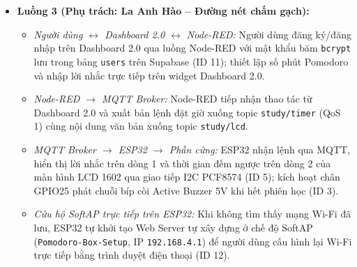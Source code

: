 \begin{itemize}[leftmargin=0.8cm, noitemsep, topsep=2pt]
    \item \textbf{Luồng 3 (Phụ trách: La Anh Hào -- Đường nét chấm gạch):}
    \begin{itemize}[leftmargin=0.5cm, noitemsep]
        \item \textit{Người dùng $\leftrightarrow$ Dashboard 2.0 $\leftrightarrow$ Node-RED:} Người dùng đăng ký/đăng nhập trên Dashboard 2.0 qua luồng Node-RED với mật khẩu băm \texttt{bcrypt} lưu trong bảng \texttt{users} trên Supabase (ID 11); thiết lập số phút Pomodoro và nhập lời nhắc trực tiếp trên widget Dashboard 2.0.
        \item \textit{Node-RED $\rightarrow$ MQTT Broker:} Node-RED tiếp nhận thao tác từ Dashboard 2.0 và xuất bản lệnh đặt giờ xuống topic \texttt{study/timer} (QoS 1) cùng nội dung văn bản xuống topic \texttt{study/lcd}.
        \item \textit{MQTT Broker $\rightarrow$ ESP32 $\rightarrow$ Phần cứng:} ESP32 nhận lệnh qua MQTT, hiển thị lời nhắc trên dòng 1 và thời gian đếm ngược trên dòng 2 của màn hình LCD 1602 qua giao tiếp I2C PCF8574 (ID 5); kích hoạt chân GPIO25 phát chuỗi bíp còi Active Buzzer 5V khi hết phiên học (ID 3).
        \item \textit{Cứu hộ SoftAP trực tiếp trên ESP32:} Khi không tìm thấy mạng Wi-Fi đã lưu, ESP32 tự khởi tạo Web Server tự xây dựng ở chế độ SoftAP (\texttt{Pomodoro-Box-Setup}, IP \texttt{192.168.4.1}) để người dùng cấu hình lại Wi-Fi trực tiếp bằng trình duyệt điện thoại (ID 12).
    \end{itemize}
\end{itemize}
